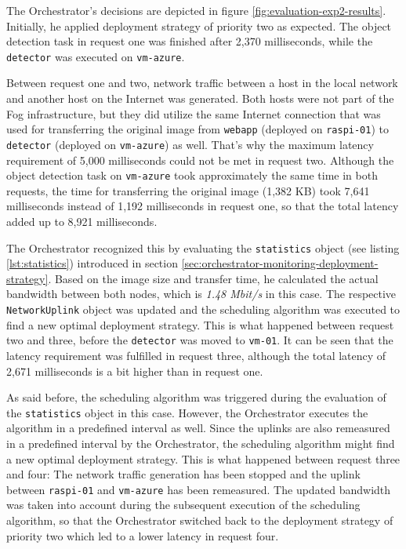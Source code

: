 The Orchestrator's decisions are depicted in figure \ref{fig:evaluation-exp2-results}. 
Initially, he applied deployment strategy of priority two as expected.
The object detection task in request one was finished after 2,370 milliseconds, while the \texttt{detector} was executed on \texttt{vm-azure}.

Between request one and two, network traffic between a host in the local network and another host on the Internet was generated.
Both hosts were not part of the Fog infrastructure, but they did utilize the same Internet connection that was used for transferring the original image from \texttt{webapp} (deployed on \texttt{raspi-01}) to \texttt{detector} (deployed on \texttt{vm-azure}) as well.
That's why the maximum latency requirement of 5,000 milliseconds could not be met in request two.
Although the object detection task on \texttt{vm-azure} took approximately the same time in both requests, the time for transferring the original image (1,382 KB) took 7,641 milliseconds instead of 1,192 milliseconds in request one, so that the total latency added up to 8,921 milliseconds.

The Orchestrator recognized this by evaluating the \texttt{statistics} object (see listing \ref{lst:statistics}) introduced in section \ref{sec:orchestrator-monitoring-deployment-strategy}.
Based on the image size and transfer time, he calculated the actual bandwidth between both nodes, which is \textit{1.48 Mbit/s} in this case.
The respective \texttt{NetworkUplink} object was updated and the scheduling algorithm was executed to find a new optimal deployment strategy.
This is what happened between request two and three, before the \texttt{detector} was moved to \texttt{vm-01}.
It can be seen that the latency requirement was fulfilled in request three, although the total latency of 2,671 milliseconds is a bit higher than in request one.

As said before, the scheduling algorithm was triggered during the evaluation of the \texttt{statistics} object in this case.
However, the Orchestrator executes the algorithm in a predefined interval as well.
Since the uplinks are also remeasured in a predefined interval by the Orchestrator, the scheduling algorithm might find a new optimal deployment strategy.
This is what happened between request three and four:
The network traffic generation has been stopped and the uplink between \texttt{raspi-01} and \texttt{vm-azure} has been remeasured.
The updated bandwidth was taken into account during the subsequent execution of the scheduling algorithm, so that the Orchestrator switched back to the deployment strategy of priority two which led to a lower latency in request four.

